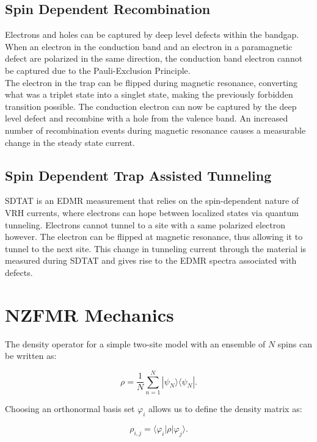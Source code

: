 \documentclass[svgnames]{article}
\begin{document}
\subsection{Spin Dependent Recombination} 

Electrons and holes can be captured by deep level defects within the bandgap.
When an electron in the conduction band and an electron in a paramagnetic defect
are polarized in the same direction, the conduction band electron cannot be
captured due to the Pauli-Exclusion Principle. \\

The electron in the trap can be flipped during magnetic resonance, converting
what was a triplet state into a
singlet state, making the previously forbidden transition possible. The
conduction electron can now be captured by the deep level defect and recombine
with a hole from the valence band. An increased number of recombination events
during magnetic resonance causes a measurable change in the steady state
current. \\ 

\subsection{Spin Dependent Trap Assisted Tunneling} 

SDTAT is an EDMR measurement that relies on the spin-dependent nature of VRH
currents, where electrons can hope between localized states via quantum
tunneling. Electrons cannot tunnel to a site with a same polarized electron
however. The electron can be flipped at magnetic resonance, thus allowing it to
tunnel to the next site. This change in tunneling current through the material
is measured during SDTAT and gives rise to the EDMR spectra associated with
defects. 

\newpage 
\section{NZFMR Mechanics} 

The density operator for a simple two-site model with an ensemble of $N$ spins
can be written as: 

\[ \rho = \frac{1}{N}\sum_{n=1}^{N} | \psi_N \rangle \langle \psi_N |.
\]\vspace{3px} 


Choosing an orthonormal basis set $\varphi_i$ allows us to define the density
matrix as: 

\[
    \rho_{i,j} = \langle \varphi_i | \rho | \varphi_j \rangle. 
\] \vspace{3px}
\end{document}
